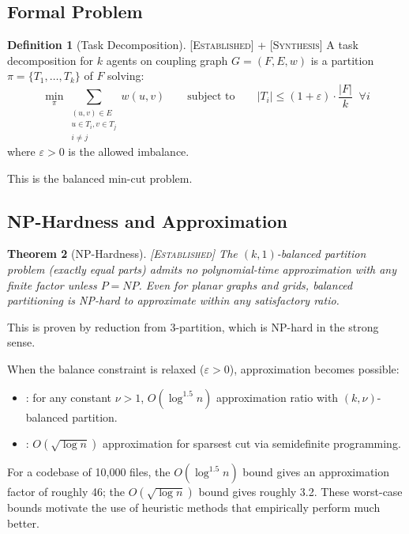 \documentclass[11pt]{article}
\newtheorem{theorem}{Theorem}[section]
\theoremstyle{definition}
\newtheorem{definition}[theorem]{Definition}
\theoremstyle{remark}
\newcommand{\established}{\textsc{[Established]}}
\newcommand{\synthesis}{\textsc{[Synthesis]}}
\begin{document}
\subsection{Formal Problem}

\begin{definition}[Task Decomposition] \established{} + \synthesis{}
\label{def:decomp}
A task decomposition for $k$ agents on coupling graph $G = (F, E, w)$ is a partition $\pi = \{T_1, \ldots, T_k\}$ of $F$ solving:
\begin{equation}
\label{eq:mincut}
  \min_\pi \sum_{\substack{(u,v) \in E \\ u \in T_i, v \in T_j \\ i \neq j}} w(u,v) \qquad \text{subject to} \qquad |T_i| \leq (1+\varepsilon) \cdot \frac{|F|}{k} \;\; \forall i
\end{equation}
where $\varepsilon > 0$ is the allowed imbalance.
\end{definition}

This is the balanced min-cut problem.

\subsection{NP-Hardness and Approximation}

\begin{theorem}[NP-Hardness] \established{}
\label{thm:nphard}
The $(k, 1)$-balanced partition problem (exactly equal parts) admits no polynomial-time approximation with any finite factor unless $P = NP$.
Even for planar graphs and grids, balanced partitioning is NP-hard to approximate within any satisfactory ratio.
\end{theorem}

This is proven by reduction from 3-partition, which is NP-hard in the strong sense.

When the balance constraint is relaxed ($\varepsilon > 0$), approximation becomes possible:

\begin{itemize}[nosep]
  \item \citet{AndreevRacke2006}: for any constant $\nu > 1$, $O(\log^{1.5} n)$ approximation ratio with $(k, \nu)$-balanced partition.
  \item \citet{AroraRaoVazirani2009}: $O(\sqrt{\log n})$ approximation for sparsest cut via semidefinite programming.
\end{itemize}

For a codebase of 10,000 files, the $O(\log^{1.5} n)$ bound gives an approximation factor of roughly 46; the $O(\sqrt{\log n})$ bound gives roughly 3.2.
These worst-case bounds motivate the use of heuristic methods that empirically perform much better.
\end{document}
